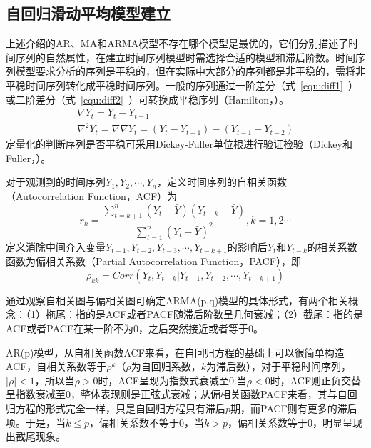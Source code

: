 \subsection{自回归滑动平均模型建立}
\label{chap:armamodelbuilding}

上述介绍的AR、MA和ARMA模型不存在哪个模型是最优的，它们分别描述了时间序列的自然属性，在建立时间序列模型时需选择合适的模型和滞后阶数。时间序列模型要求分析的序列是平稳的，但在实际中大部分的序列都是非平稳的，需将非平稳时间序列转化成平稳时间序列。一般的序列通过一阶差分（式~\ref{equ:diff1}~）或二阶差分（式~\ref{equ:diff2}~）可转换成平稳序列（Hamilton，\citeyear{hamilton1994time}）。
\begin{gather}
	\label{equ:diff1}
	\nabla {{Y}_{t}}={{Y}_{t}}-{{Y}_{t-1}} \\ 
	\label{equ:diff2}
	{{\nabla }^{2}}{{Y}_{t}}=\nabla \nabla {{Y}_{t}}=({{Y}_{t}}-{{Y}_{t-1}})-({{Y}_{t-1}}-{{Y}_{t-2}}) 
\end{gather}
定量化的判断序列是否平稳可采用Dickey-Fuller单位根进行验证检验（Dickey和Fuller，\citeyear{dickey1979distribution}）。

对于观测到的时间序列${{Y}_{1}},{{Y}_{2}},\cdots ,{{Y}_{n}}$，定义时间序列的自相关函数（Autocorrelation Function，ACF）为
\begin{equation}
	{{r}_{k}}=\frac{\sum\limits_{t=k+1}^{n}{({{Y}_{t}}-\bar{Y})({{Y}_{t-k}}-\bar{Y})}}{\sum\limits_{t=1}^{n}{{{({{Y}_{t}}-\bar{Y})}^{2}}}},k=1,2\cdots 
\end{equation}
定义消除中间介入变量${{Y}_{t-1}},{{Y}_{t-2}},{{Y}_{t-3}},\cdots ,{{Y}_{t-k+1}}$的影响后$Y_t$和$Y_{t-k}$的相关系数函数为偏相关系数（Partial Autocorrelation Function，PACF），即
\begin{equation}
	{{\rho }_{kk}}=Corr({{Y}_{t}},{{Y}_{t-k}}|{{Y}_{t-1}},{{Y}_{t-2}},\cdots ,{{Y}_{t-k+1}})
\end{equation}

通过观察自相关图与偏相关图可确定ARMA(p,q)模型的具体形式，有两个相关概念：（1）拖尾：指的是ACF或者PACF随滞后阶数呈几何衰减；（2）截尾：指的是ACF或者PACF在某一阶不为0，之后突然接近或者等于0。

AR(p)模型，从自相关函数ACF来看，在自回归方程的基础上可以很简单构造ACF，自相关系数等于${{\rho }^{k}}$（${\rho }$为自回归系数，$k$为滞后数），对于平稳时间序列，$\left| \rho  \right|<1$，所以当${\rho }>0$时，ACF呈现为指数式衰减至0.当${\rho }<0$时，ACF则正负交替呈指数衰减至0，整体表现则是正弦式衰减；从偏相关函数PACF来看，其与自回归方程的形式完全一样，只是自回归方程只有滞后$p$期，而PACF则有更多的滞后项。于是，当$k\le p$，偏相关系数不等于0，当$k>p$，偏相关系数等于0，明显呈现出截尾现象。


